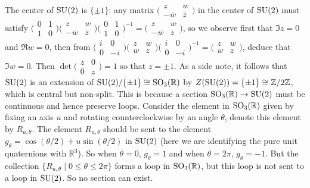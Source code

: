 \documentclass[../../rtnotes.tex]{subfiles}
\begin{document}
The center of $\operatorname{SU}(2)$ is $\{\pm 1\}$: any matrix $\bigl(\!\begin{smallmatrix}
	z & w \\ -\overline w & \overline z
\end{smallmatrix}\!\bigr)$ in the center of $\operatorname{SU}(2)$ must satisfy $\bigl(\!\begin{smallmatrix}
	0 & 1 \\ 1 & 0
\end{smallmatrix}\!\bigr)\bigl(\!\begin{smallmatrix}
	z & w \\ -\overline w & \overline z
\end{smallmatrix}\!\bigr)\bigl(\!\begin{smallmatrix}
	0 & 1 \\ 1 & 0
\end{smallmatrix}\!\bigr)^{-1} = \bigl(\!\begin{smallmatrix}
	z & w \\ -\overline w & \overline z
\end{smallmatrix}\!\bigr)$, so we observe first that $\Im z = 0$ and $\Re w  = 0$, then from $\bigl(\!\begin{smallmatrix}
	i & 0 \\ 0 & -i
\end{smallmatrix}\!\bigr)\bigl(\!\begin{smallmatrix}
	z & w \\ w & z
\end{smallmatrix}\!\bigr)\bigl(\!\begin{smallmatrix}
	i & 0 \\ 0 & -i
\end{smallmatrix}\!\bigr)^{-1} = \bigl(\!\begin{smallmatrix}
	z & w \\ w & z
\end{smallmatrix}\!\bigr)$, deduce that $\Im w = 0$. Then $\det \bigl(\!\begin{smallmatrix}
	z & 0 \\ 0 & z
\end{smallmatrix}\!\bigr) = 1$ so that $z = \pm 1$. As a side note, it follows that $\operatorname{SU}(2)$ is an extension of $\operatorname{SU}(2)/\{\pm 1\} \cong \operatorname{SO}_3(\mathbb R)$ by $Z(\operatorname{SU}(2)) = \{\pm 1\}\cong \mathbb Z/2\mathbb Z$, which is central but non-split. This is because a section $\operatorname{SO}_3(\mathbb R)\to \operatorname{SU}(2)$ must be continuous and hence preserve loops. Consider the element in $\operatorname{SO}_3(\mathbb R)$ given by fixing an axis $u$ and rotating counterclockwise by an angle $\theta$, denote this element by $R_{u,\theta}$. The element $R_{u,\theta}$ should be sent to the element $g_\theta = \cos(\theta/2)+u\sin(\theta/2)$ in $\operatorname{SU}(2)$ (here we are identifying the pure unit quaternions with $\mathbb R^3$). So when $\theta = 0$, $g_\theta = 1$ and when $\theta = 2\pi$, $g_\theta = -1$. But the collection $\{R_{u,\theta}\mid 0\leq \theta\leq 2\pi\}$ forms a loop in $\operatorname{SO}_3(\mathbb R)$, but this loop is not sent to a loop in $\operatorname{SU}(2)$. So no section can exist.
\end{document}
